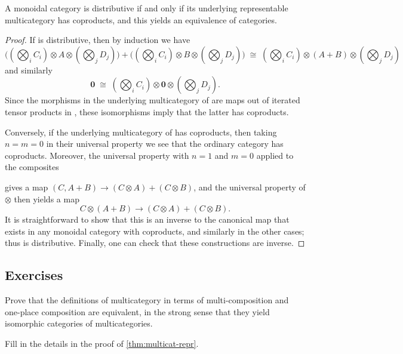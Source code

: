 \documentclass{book}
\def\zero{\mathbf{0}}
\let\tensor\otimes
\begin{document}
\begin{thm}\label{thm:multicat-coprod}
  A monoidal category is distributive if and only if its underlying representable multicategory has coproducts, and this yields an equivalence of categories.
\end{thm}
\begin{proof}
  If \cM is distributive, then by induction we have
  \[ \textstyle
  \Big((\bigotimes_i C_i)\tensor A \tensor (\bigotimes_j D_j)\Big) +
  \Big((\bigotimes_i C_i)\tensor B \tensor (\bigotimes_j D_j)\Big)
  \;\cong\;
  (\bigotimes_i C_i)\tensor (A+B) \tensor (\bigotimes_j D_j)
  \]
  and similarly
  \[ \zero \;\cong\; \textstyle (\bigotimes_i C_i)\tensor \zero \tensor (\bigotimes_j D_j).\]
  Since the morphisms in the underlying multicategory of \cM are maps out of iterated tensor products in \cM, these isomorphisms imply that the latter has coproducts.

  Conversely, if the underlying multicategory of \cM has coproducts, then taking $n=m=0$ in their universal property we see that the ordinary category \cM has coproducts.
  Moreover, the universal property with $n=1$ and $m=0$ applied to the composites
  gives a map $(C,A+B) \to (C\tensor A)+(C\tensor B)$, and the universal property of $\tensor$ then yields a map
  \[C\tensor(A+B) \to (C\tensor A)+(C\tensor B). \]
  It is straightforward to show that this is an inverse to the canonical map that exists in any monoidal category with coproducts, and similarly in the other cases; thus \cM is distributive.
  Finally, one can check that these constructions are inverse.
\end{proof}


\subsection*{Exercises}

\begin{ex}\label{ex:multicat-defns}
  Prove that the definitions of multicategory in terms of multi-composition and one-place composition are equivalent, in the strong sense that they yield isomorphic categories of multicategories.
\end{ex}

\begin{ex}\label{ex:multicat-repr}
  Fill in the details in the proof of \cref{thm:multicat-repr}.
\end{ex}
\end{document}
